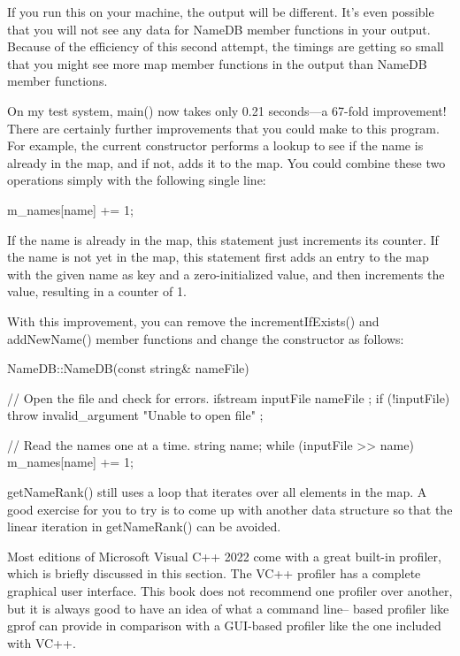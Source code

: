 If you run this on your machine, the output will be different. It’s even possible that you will not see any data for NameDB member functions in your output. Because of the efficiency of this second attempt, the timings are getting so small that you might see more map member functions in the output than NameDB member functions.

On my test system, main() now takes only 0.21 seconds—a 67-fold improvement! There are certainly further improvements that you could make to this program. For example, the current constructor performs a lookup to see if the name is already in the map, and if not, adds it to the map. You could combine these two operations simply with the following single line:

\begin{cpp}
m_names[name] += 1;
\end{cpp}

If the name is already in the map, this statement just increments its counter. If the name is not yet in the map, this statement first adds an entry to the map with the given name as key and a zero-initialized value, and then increments the value, resulting in a counter of 1.

With this improvement, you can remove the incrementIfExists() and addNewName() member functions and change the constructor as follows:

\begin{cpp}
NameDB::NameDB(const string& nameFile)
{
    // Open the file and check for errors.
    ifstream inputFile { nameFile };
    if (!inputFile) {
        throw invalid_argument { "Unable to open file" };
    }

    // Read the names one at a time.
    string name;
    while (inputFile >> name) {
        m_names[name] += 1;
    }
}
\end{cpp}

getNameRank() still uses a loop that iterates over all elements in the map. A good exercise for you to try is to come up with another data structure so that the linear iteration in getNameRank() can be avoided.


Most editions of Microsoft Visual C++ 2022 come with a great built-in profiler, which is briefly discussed in this section. The VC++ profiler has a complete graphical user interface. This book does not recommend one profiler over another, but it is always good to have an idea of what a command line– based profiler like gprof can provide in comparison with a GUI-based profiler like the one included with VC++.

